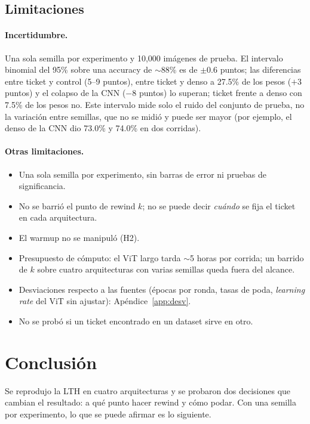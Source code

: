 \documentclass[11pt]{article}
\begin{document}
\subsection{Limitaciones}\label{sec:limitaciones}
\paragraph{Incertidumbre.} Una sola semilla por experimento y 10,000 imágenes de prueba. El intervalo binomial del 95\% sobre una accuracy de $\sim$88\% es de $\pm0.6$ puntos; las diferencias entre ticket y control (5--9 puntos), entre ticket y denso a 27.5\% de los pesos ($+3$ puntos) y el colapso de la CNN ($-8$ puntos) lo superan; ticket frente a denso con 7.5\% de los pesos no. Este intervalo mide solo el ruido del conjunto de prueba, no la variación entre semillas, que no se midió y puede ser mayor (por ejemplo, el denso de la CNN dio 73.0\% y 74.0\% en dos corridas).

\paragraph{Otras limitaciones.}
\begin{itemize}[nosep]
    \item Una sola semilla por experimento, sin barras de error ni pruebas de significancia.
    \item No se barrió el punto de rewind $k$; no se puede decir \textit{cuándo} se fija el ticket en cada arquitectura.
    \item El warmup no se manipuló (H2).
    \item Presupuesto de cómputo: el ViT largo tarda $\sim$5 horas por corrida; un barrido de $k$ sobre cuatro arquitecturas con varias semillas queda fuera del alcance.
    \item Desviaciones respecto a las fuentes (épocas por ronda, tasas de poda, \textit{learning rate} del ViT sin ajustar): Apéndice~\ref{app:desv}.
    \item No se probó si un ticket encontrado en un dataset sirve en otro.
\end{itemize}

\newpage
\section{Conclusión}
Se reprodujo la LTH en cuatro arquitecturas y se probaron dos decisiones que cambian el resultado: a qué punto hacer rewind y cómo podar. Con una semilla por experimento, lo que se puede afirmar es lo siguiente.
\end{document}
